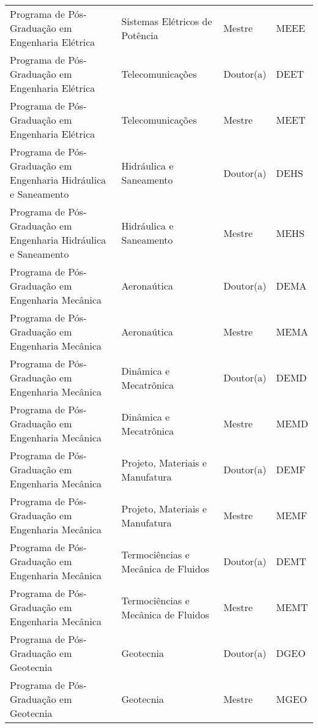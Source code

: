 \begin{apendicesenv}
\begin{quadro}[Htb]
\begin{tabular}{|p{6.0cm}|p{4.5cm}|p{2.0cm}|p{1.75cm}|}
Programa de P\'os-Gradua\c{c}\~ao em Engenharia El\'etrica & Sistemas El\'etricos de Pot\^encia & Mestre & MEEE \\
Programa de P\'os-Gradua\c{c}\~ao em Engenharia El\'etrica & Telecomunica\c{c}\~oes & Doutor(a) & DEET \\
Programa de P\'os-Gradua\c{c}\~ao em Engenharia El\'etrica & Telecomunica\c{c}\~oes & Mestre & MEET \\
Programa de P\'os-Gradua\c{c}\~ao em Engenharia Hidr\'aulica e Saneamento & Hidr\'aulica e Saneamento & Doutor(a) & DEHS \\
Programa de P\'os-Gradua\c{c}\~ao em Engenharia Hidr\'aulica e Saneamento & Hidr\'aulica e Saneamento & Mestre & MEHS \\
Programa de P\'os-Gradua\c{c}\~ao em Engenharia Mec\^anica & Aerona\'utica & Doutor(a) & DEMA \\
Programa de P\'os-Gradua\c{c}\~ao em Engenharia Mec\^anica & Aerona\'utica & Mestre & MEMA \\
Programa de P\'os-Gradua\c{c}\~ao em Engenharia Mec\^anica & Din\^amica e Mecatr\^onica & Doutor(a) & DEMD \\
Programa de P\'os-Gradua\c{c}\~ao em Engenharia Mec\^anica & Din\^amica e Mecatr\^onica & Mestre & MEMD \\
Programa de P\'os-Gradua\c{c}\~ao em Engenharia Mec\^anica & Projeto, Materiais e Manufatura  & Doutor(a) & DEMF \\
Programa de P\'os-Gradua\c{c}\~ao em Engenharia Mec\^anica & Projeto, Materiais e Manufatura  & Mestre & MEMF \\
Programa de P\'os-Gradua\c{c}\~ao em Engenharia Mec\^anica & Termoci\^encias e Mec\^anica de Fluidos & Doutor(a) & DEMT \\
Programa de P\'os-Gradua\c{c}\~ao em Engenharia Mec\^anica & Termoci\^encias e Mec\^anica de Fluidos & Mestre & MEMT \\
Programa de P\'os-Gradua\c{c}\~ao em Geotecnia & Geotecnia & Doutor(a) & DGEO \\
Programa de P\'os-Gradua\c{c}\~ao em Geotecnia & Geotecnia & Mestre & MGEO \\
    
\end{tabular}
\end{quadro}


\end{apendicesenv}
